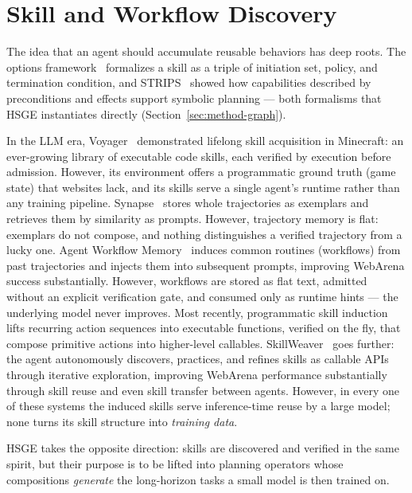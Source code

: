 \section{Skill and Workflow Discovery}
\label{sec:rel-skills}

The idea that an agent should accumulate reusable behaviors has deep roots.
The options framework~\cite{sutton1999options} formalizes a skill as a triple
of initiation set, policy, and termination condition, and
STRIPS~\cite{fikes1971strips} showed how capabilities described by
preconditions and effects support symbolic planning --- both formalisms that
HSGE instantiates directly (Section~\ref{sec:method-graph}).

In the LLM era, Voyager~\cite{wang2024voyager} demonstrated lifelong skill
acquisition in Minecraft: an ever-growing library of executable code skills,
each verified by execution before admission. However, its environment offers
a programmatic ground truth (game state) that websites lack, and its skills
serve a single agent's runtime rather than any training pipeline.
Synapse~\cite{zheng2024synapse} stores whole trajectories as exemplars and
retrieves them by similarity as prompts. However, trajectory memory is flat:
exemplars do not compose, and nothing distinguishes a verified trajectory
from a lucky one. Agent Workflow Memory~\cite{wang2024awm} induces common
routines (workflows) from past trajectories and injects them into subsequent
prompts, improving WebArena success substantially. However, workflows are
stored as flat text, admitted without an explicit verification gate, and
consumed only as runtime hints --- the underlying model never improves.
Most recently, programmatic skill induction~\cite{wang2025asi} lifts
recurring action sequences into executable functions, verified on the fly,
that compose primitive actions into higher-level callables.
SkillWeaver~\cite{zheng2025skillweaver} goes further: the agent autonomously
discovers, practices, and refines skills as callable APIs through iterative
exploration, improving WebArena performance substantially through skill reuse
and even skill transfer between agents. However, in every one of these systems the
induced skills serve inference-time reuse by a large model; none turns its
skill structure into \emph{training data}.

HSGE takes the opposite direction: skills are discovered and verified in the
same spirit, but their purpose is to be lifted into planning operators whose
compositions \emph{generate} the long-horizon tasks a small model is then
trained on.

